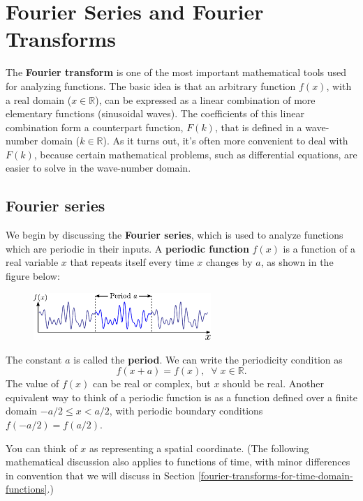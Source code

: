 \documentclass[10pt,a4paper]{article}
\begin{document}
\setcounter{page}{71}

\section{Fourier Series and Fourier Transforms}
\label{fourier-series-and-fourier-transforms}

The \textbf{Fourier transform} is one of the most important mathematical
tools used for analyzing functions. The basic idea is that an arbitrary
function $f(x)$, with a real domain ($x \in \mathbb{R}$), can be
expressed as a linear combination of more elementary functions
(sinusoidal waves). The coefficients of this linear combination form a
counterpart function, $F(k)$, that is defined in a wave-number domain
($k \in \mathbb{R}$). As it turns out, it's often more convenient to
deal with $F(k)$, because certain mathematical problems, such as
differential equations, are easier to solve in the wave-number domain.

\subsection{Fourier series}\label{fourier-series}

We begin by discussing the \textbf{Fourier series}, which is used to
analyze functions which are periodic in their inputs. A \textbf{periodic
function} $f(x)$ is a function of a real variable $x$ that repeats
itself every time $x$ changes by $a$, as shown in the figure below:

\begin{figure}[h]
  \centering\includegraphics[width=0.6\textwidth]{periodicity}
\end{figure}

The constant $a$ is called the \textbf{period}. We can write the
periodicity condition as
\begin{equation}
f(x+a) = f(x), \;\; \forall\; x\in \mathbb{R}.
\end{equation}
The value of $f(x)$ can be real or complex, but $x$ should be real.
Another equivalent way to think of a periodic function is as a function
defined over a finite domain $-a/2 \le x < a/2$, with periodic
boundary conditions $f(-a/2) = f(a/2)$.

You can think of $x$ as representing a spatial coordinate. (The
following mathematical discussion also applies to functions of time,
with minor differences in convention that we will discuss in Section
\ref{fourier-transforms-for-time-domain-functions}.)
\end{document}
